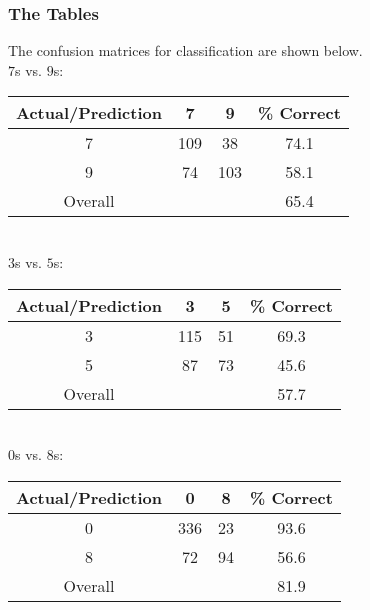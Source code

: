 \documentclass{article}
\begin{document}
\subsubsection{The Tables}
The confusion matrices for classification are shown below.\\
\newline
$7$s vs. $9$s:\\
\newline
\begin{tabular}{| c || c | c || c |}
  \hline
  Actual/Prediction &   7 &   9 &\% Correct \\
  \hline
  \hline
  7                 & 109 &  38 & 74.1 \\
  \hline
  9                 &  74 & 103 & 58.1 \\
  \hline
  \hline
  Overall           &     &     & 65.4 \\
  \hline
\end{tabular}\\
\newline
\newline
%
$3$s vs. $5$s:\\
\newline
\begin{tabular}{| c || c | c || c |}
  \hline
  Actual/Prediction &   3 &   5 &\% Correct \\
  \hline
  \hline
  3                 & 115 &  51 & 69.3 \\
  \hline
  5                 &  87 &  73 & 45.6 \\
  \hline
  \hline
  Overall           &     &     & 57.7 \\
  \hline
\end{tabular}\\
\newline
\newline
%
$0$s vs. $8$s:\\
\newline
\begin{tabular}{| c || c | c || c |}
  \hline
  Actual/Prediction &   0 &   8 &\% Correct \\
  \hline
  \hline
  0                 & 336 &  23 & 93.6 \\
  \hline
  8                 &  72 &  94 & 56.6 \\
  \hline
  \hline
  Overall           &     &     & 81.9 \\
  \hline
\end{tabular}
\newline
%
\end{document}
